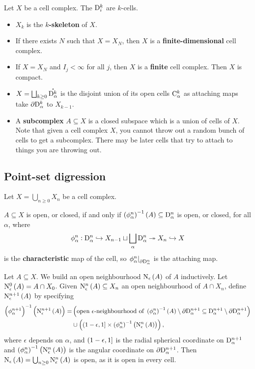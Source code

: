 \begin{notation*}
Let $ X $ be a cell complex. The $ \mathrm{D}_i^k $ are $ k $-cells.
\begin{itemize}
\item $ X_k $ is the \textbf{$ k $-skeleton} of $ X $.
\item If there exists $ N $ such that $ X = X_N $, then $ X $ is a \textbf{finite-dimensional} cell complex.
\item If $ X = X_N $ and $ I_j < \infty $ for all $ j $, then $ X $ is a \textbf{finite} cell complex. Then $ X $ is compact.
\item $ X = \bigsqcup_{k \ge 0} \mathring{\mathrm{D}_\alpha^k} $ is the disjoint union of its open cells $ \mathrm{C}_\alpha^k $ as attaching maps take $ \partial\mathrm{D}_\alpha^k $ to $ X_{k - 1} $.
\item A \textbf{subcomplex} $ A \subseteq X $ is a closed subspace which is a union of cells of $ X $. Note that given a cell complex $ X $, you cannot throw out a random bunch of cells to get a subcomplex. There may be later cells that try to attach to things you are throwing out.
\end{itemize}
\end{notation*}

\subsection{Point-set digression}

Let $ X = \bigcup_{n \ge 0} X_n $ be a cell complex.

\begin{exercise*}
$ A \subseteq X $ is open, or closed, if and only if $ \br{\phi_\alpha^n}^{-1}\br{A} \subseteq \D_\alpha^n $ is open, or closed, for all $ \alpha $, where
$$ \phi_\alpha^n : \mathrm{D}_\alpha^n \hookrightarrow X_{n - 1} \sqcup \bigsqcup_\alpha \mathrm{D}_\alpha^n \twoheadrightarrow X_n \hookrightarrow X $$
is the \textbf{characteristic} map of the cell, so $ \left. \phi_\alpha^n \right|_{\partial\mathrm{D}_\alpha^n} $ is the attaching map.
\end{exercise*}

\pagebreak

Let $ A \subseteq X $. We build an open neighbourhood $ \N_\epsilon\br{A} $ of $ A $ inductively. Let $ \N_\epsilon^0\br{A} = A \cap X_0 $. Given $ \N_\epsilon^n\br{A} \subseteq X_n $ an open neighbourhood of $ A \cap X_n $, define $ \N_\epsilon^{n + 1}\br{A} $ by specifying
\begin{align*}
\br{\phi_\alpha^{n + 1}}^{-1}\br{\N_\epsilon^{n + 1}\br{A}}
= & \br{\text{open $ \epsilon $-neighbourhood of} \ \br{\phi_\alpha^n}^{-1}\br{A} \setminus \da\D_\alpha^{n + 1} \subseteq \D_\alpha^{n + 1} \setminus \da\D_\alpha^{n + 1}} \\
& \cup \br{\intoc{1 - \epsilon, 1} \times \br{\phi_\alpha^n}^{-1}\br{\N_\epsilon^n\br{A}}},
\end{align*}
where $ \epsilon $ depends on $ \alpha $, and $ \intoc{1 - \epsilon, 1} $ is the radial spherical coordinate on $ \mathrm{D}_\alpha^{n + 1} $ and $ \br{\phi_\alpha^n}^{-1}\br{\N_\epsilon^n\br{A}} $ is the angular coordinate on $ \partial\mathrm{D}_\alpha^{n + 1} $. Then $ \N_\epsilon\br{A} = \bigcup_{n \ge 0} \N_\epsilon^n\br{A} $ is open, as it is open in every cell.

